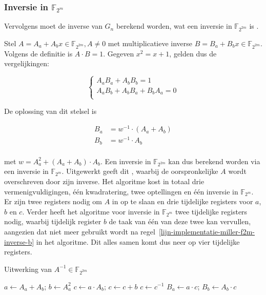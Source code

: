 \subsubsection{Inversie in $\mathbb{F}_{2^m}$}

Vervolgens moet de inverse van $G_n$ berekend worden, wat een inversie in $\mathbb{F}_{2^{2m}}$ is \cite{beuchat}.

Stel $A = A_a + A_b x \in \mathbb{F}_{2^{2m}}, A \neq 0$ met multiplicatieve inverse $B = B_a + B_b x \in \mathbb{F}_{2^{2m}}$. Volgens de definitie is $A \cdot B = 1$. Gegeven $x^2 = x + 1$, gelden dus de vergelijkingen:

\[\left\{\begin{array}{l}
A_a B_a + A_b B_b = 1\\
A_a B_b + A_b B_a + B_b A_a = 0\\
\end{array}\right.\]

De oplossing van dit stelsel is

\[\begin{aligned}
B_a	&= w^{-1} \cdot (A_a + A_b)\\
B_b	&= w^{-1} \cdot A_b\\
\end{aligned}\]

met $w = A_a^2 + (A_a + A_b) \cdot A_b$. Een inversie in $\mathbb{F}_{2^{2m}}$ kan dus berekend worden via een inversie in $\mathbb{F}_{2^m}$. Uitgewerkt geeft dit , waarbij de oorspronkelijke $A$ wordt overschreven door zijn inverse. Het algoritme kost in totaal drie vermenigvuldigingen, \'e\'en kwadratering, twee optellingen en \'e\'en inversie in $\mathbb{F}_{2^m}$. Er zijn twee registers nodig om $A$ in op te slaan en drie tijdelijke registers voor $a$, $b$ en $c$. Verder heeft het algoritme voor inversie in $\mathbb{F}_{2^m}$ twee tijdelijke registers nodig, waarbij tijdelijk register $b$ de taak van \'e\'en van deze twee kan vervullen, aangezien dat niet meer gebruikt wordt na regel~\ref{lijn-implementatie-miller-f2m-inverse-b} in het algoritme. Dit alles samen komt dus neer op vier tijdelijke registers.

\begin{algorithm}[h]
	\caption{Uitwerking van $A^{-1} \in \mathbb{F}_{2^{2m}}$}
	\label{algoritme-implementatie-miller-f2m-inverse}
	$a \leftarrow A_a + A_b$; $b \leftarrow A_a^2$\;
	$c \leftarrow a \cdot A_b$; $c \leftarrow c + b$\;
	$c \leftarrow c^{-1}$\;
	$B_a \leftarrow a \cdot c$; $B_b \leftarrow A_b \cdot c$\;
\end{algorithm}

